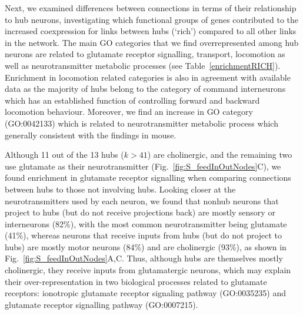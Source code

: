 \documentclass[10pt,letterpaper]{article}
\begin{document}
Next, we examined differences between connections in terms of their relationship to hub neurons, investigating which functional groups of genes contributed to the increased coexpression for links between hubs (`rich') compared to all other links in the network.
The main GO categories that we find overrepresented among hub neurons are related to glutamate receptor signalling, transport, locomotion as well as neurotransmitter metabolic processes (see Table~\ref{enrichmentRICH}).
Enrichment in locomotion related categories is also in agreement with available data as the majority of hubs belong to the category of command interneurons which has an established function of controlling forward and backward locomotion behaviour. 
Moreover, we find an increase in GO category (GO:0042133) which is related to neurotransmitter metabolic process which generally consistent with the findings in mouse. 

Although 11 out of the 13 hubs ($k > 41$) are cholinergic, and the remaining two use glutamate as their neurotransmitter (Fig.~\ref{fig:S_feedInOutNodes}C), we found enrichment in glutamate receptor signalling when comparing connections between hubs to those not involving hubs. 
Looking closer at the neurotransmitters used by each neuron, we found that nonhub neurons that project to hubs (but do not receive projections back) are mostly sensory or interneurons (82\%), with the most common neurotransmitter being glutamate (41\%), whereas neurons that receive inputs from hubs (but do not project to hubs) are mostly motor neurons (84\%) and are cholinergic (93\%), as shown in Fig.~\ref{fig:S_feedInOutNodes}A,C.
Thus, although hubs are themselves mostly cholinergic, they receive inputs from glutamatergic neurons, which may explain their over-representation in two biological processes related to glutamate receptors: ionotropic glutamate receptor signaling pathway (GO:0035235) and glutamate receptor signalling pathway (GO:0007215).\\
\end{document}
